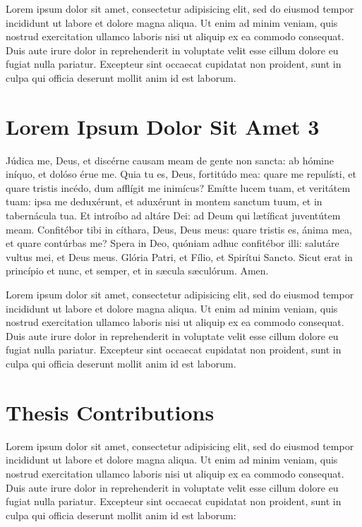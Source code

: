 Lorem ipsum dolor sit amet, consectetur adipisicing elit, sed do eiusmod tempor incididunt ut labore et dolore magna aliqua. Ut enim ad minim veniam, quis nostrud exercitation ullamco laboris nisi ut aliquip ex ea commodo consequat. Duis aute irure dolor in reprehenderit in voluptate velit esse cillum dolore eu fugiat nulla pariatur. Excepteur sint occaecat cupidatat non proident, sunt in culpa qui officia deserunt mollit anim id est laborum.

\section{Lorem Ipsum Dolor Sit Amet 3}\label{introduction:sec:section_name_3}

Júdica me, Deus, et discérne causam meam de gente non sancta: ab hómine iníquo, et dolóso érue me. Quia tu es, Deus, fortitúdo mea: quare me repulísti, et quare tristis incédo, dum afflígit me inimícus? Emítte lucem tuam, et veritátem tuam: ipsa me deduxérunt, et aduxérunt in montem sanctum tuum, et in tabernácula tua. Et introíbo ad altáre Dei: ad Deum qui lætíficat juventútem meam. Confitébor tibi in cíthara, Deus, Deus meus: quare tristis es, ánima mea, et quare contúrbas me? Spera in Deo, quóniam adhuc confitébor illi: salutáre vultus mei, et Deus meus. Glória Patri, et Fílio, et Spirítui Sancto. Sicut erat in princípio et nunc, et semper, et in sæcula sæculórum. Amen.

Lorem ipsum dolor sit amet, consectetur adipisicing elit, sed do eiusmod tempor incididunt ut labore et dolore magna aliqua. Ut enim ad minim veniam, quis nostrud exercitation ullamco laboris nisi ut aliquip ex ea commodo consequat. Duis aute irure dolor in reprehenderit in voluptate velit esse cillum dolore eu fugiat nulla pariatur. Excepteur sint occaecat cupidatat non proident, sunt in culpa qui officia deserunt mollit anim id est laborum.

\section{Thesis Contributions}\label{introduction:sec:contributions}

Lorem ipsum dolor sit amet, consectetur adipisicing elit, sed do eiusmod tempor incididunt ut labore et dolore magna aliqua. Ut enim ad minim veniam, quis nostrud exercitation ullamco laboris nisi ut aliquip ex ea commodo consequat. Duis aute irure dolor in reprehenderit in voluptate velit esse cillum dolore eu fugiat nulla pariatur. Excepteur sint occaecat cupidatat non proident, sunt in culpa qui officia deserunt mollit anim id est laborum:

